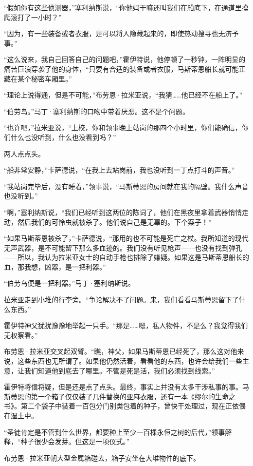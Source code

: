 \documentclass[AutoFakeBold=true]{book}
\begin{document}
``假如你有这些侦测器，''塞利纳斯说，``你他妈干嘛还叫我们在船底下，在通道里摸爬滚打了一小时？''

``因为，有一些装备或者衣服，是可以将人隐藏起来的，即使热动搜寻也无济予事。''

``这么说来，我自己回答自己的问题吧，''霍伊特说，他停顿了一秒钟，一阵明显的痛苦巨浪穿袭了他的身体，``只要有合适的装备或者衣服，马斯蒂恩船长就可能正藏在某个秘密车厢里。''

``理论上说得通，但是不可能，''布劳恩·拉米亚说，``我猜……他已经不在船上了。''

``伯劳鸟。''马丁·塞利纳斯的口吻中带着厌恶。这不是个问题。

``也许吧，''拉米亚说，``上校，你和领事晚上站岗的那四个小时里，你们能确信，你们什么也没听到，什么也没看到吗？''

两人点点头。

``船非常安静，''卡萨德说，``在我上去站岗前，我也没听到一丁点打斗的声音。''

``我站岗完毕后，没有睡着，''领事说，``马斯蒂恩的房间就在我的隔壁。我什么声音也没听到。''

``啊，''塞利纳斯说，``我们已经听到这两位的陈词了，他们在黑夜里拿着武器悄悄走动，然后我们的可怜虫就被杀了。他们说自己是无辜的。下个案子！''

``如果马斯蒂恩被杀了，''卡萨德说，``那用的也不可能是死亡之杖。我所知道的现代无声武器，是不可能留下那么多血迹的。我们没有听见枪声——也没有找到弹孔——所以，我认为拉米亚女士的自动手枪也排除了嫌疑。如果这是马斯蒂恩船长的血，那我想，凶器，是一把利器。''

``伯劳鸟便是一把利器。''马丁·塞利纳斯说。

拉米亚走到小堆的行李旁。``争论解决不了问题。来，我们看看马斯蒂恩留下了什么东西。''

霍伊特神父犹扰豫豫地举起一只手。``那是……嗯，私人物件，不是么？我觉得我们无权察看。''

布劳恩·拉米亚交叉起双臂。``瞧，神父，如果马斯蒂恩已经死了，那么这对他来说，这些东西也无所谓了。如果他仍然活着，看看他的东西，也许会给我们一些主意，让我们知道他到底去了哪里。不管是死是活，我们必须找到线索。''

霍伊特将信将疑，但是还是点了点头。最终，事实上并没有太多干涉私事的事。马斯蒂恩的第一个箱子仅仅装了几件替换的亚麻衣服，还有一本《缪尔的生命之书》。第二个袋子中装着一百包分门别类包着的种子，曾快干处理过，现在正依偎在湿土中。

``圣徒肯定是不管到什么世界，都要种上至少一百棵永恒之树的后代，''领事解释，``种子很少会发芽。但这是一项仪式。''

布劳恩·拉米亚朝大型金属箱碰去，箱子安坐在大堆物件的底下。
\end{document}
